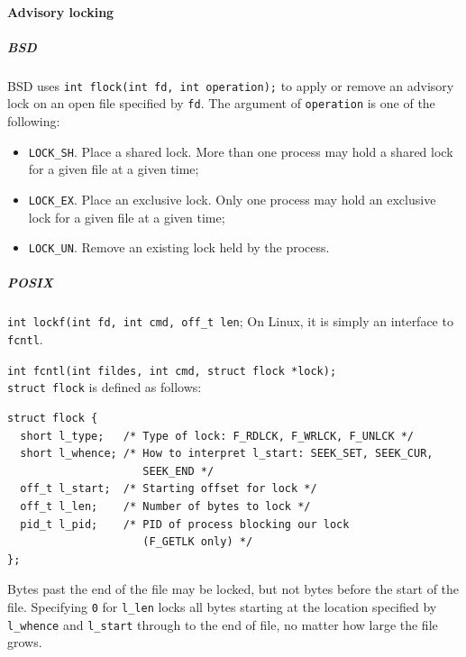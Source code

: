 \paragraph{Advisory locking}
\subparagraph{BSD}
BSD uses \texttt{int flock(int fd, int operation);} to apply or remove an advisory lock on an open file specified by \texttt{fd}. The argument of \texttt{operation} is one of the following:
\begin{itemize}
\item \texttt{LOCK\_SH}. Place a shared lock. More than one process may hold a shared lock for a given file at a given time;
\item \texttt{LOCK\_EX}. Place an exclusive lock. Only one process may hold an exclusive lock for a given file at a given time;
\item \texttt{LOCK\_UN}. Remove an existing lock held by the process.
\end{itemize}

\subparagraph{POSIX}
\texttt{int lockf(int fd, int cmd, off\_t len}; On Linux, it is simply an interface to \texttt{fcntl}.

\texttt{int fcntl(int fildes, int cmd, struct flock *lock);}
\\
\texttt{struct flock} is defined as follows:
\begin{verbatim}
struct flock {
  short l_type;   /* Type of lock: F_RDLCK, F_WRLCK, F_UNLCK */
  short l_whence; /* How to interpret l_start: SEEK_SET, SEEK_CUR,
                     SEEK_END */
  off_t l_start;  /* Starting offset for lock */
  off_t l_len;    /* Number of bytes to lock */
  pid_t l_pid;    /* PID of process blocking our lock
                     (F_GETLK only) */
};
\end{verbatim}
Bytes past the end of the file may be locked, but not bytes before the start of the file. Specifying \texttt{0} for \texttt{l\_len} locks all bytes starting at the location specified by \texttt{l\_whence} and \texttt{l\_start} through to the end of file, no matter how large the file grows.

